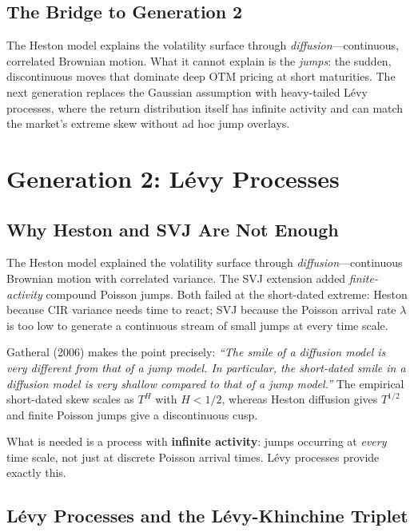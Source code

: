 \documentclass[12pt, a4paper]{article}
\begin{document}
\subsection{The Bridge to Generation 2}
\label{subsec:gen1-bridge}

The Heston model explains the volatility surface through \emph{diffusion}---continuous, correlated Brownian motion. What it cannot explain is the \emph{jumps}: the sudden, discontinuous moves that dominate deep OTM pricing at short maturities. The next generation replaces the Gaussian assumption with heavy-tailed L\'evy processes, where the return distribution itself has infinite activity and can match the market's extreme skew without ad hoc jump overlays.

\section{Generation 2: L\'evy Processes}
\label{sec:gen2-levy}

\subsection{Why Heston and SVJ Are Not Enough}
\label{subsec:gen2-motivation}

The Heston model explained the volatility surface through \emph{diffusion}---continuous Brownian motion with correlated variance. The SVJ extension added \emph{finite-activity} compound Poisson jumps. Both failed at the short-dated extreme: Heston because CIR variance needs time to react; SVJ because the Poisson arrival rate $\lambda$ is too low to generate a continuous stream of small jumps at every time scale.

Gatheral (2006) makes the point precisely: \emph{``The smile of a diffusion model is very different from that of a jump model. In particular, the short-dated smile in a diffusion model is very shallow compared to that of a jump model.''} The empirical short-dated skew scales as $T^H$ with $H < 1/2$, whereas Heston diffusion gives $T^{1/2}$ and finite Poisson jumps give a discontinuous cusp.

What is needed is a process with \textbf{infinite activity}: jumps occurring at \emph{every} time scale, not just at discrete Poisson arrival times. L\'evy processes provide exactly this.

\subsection{L\'evy Processes and the L\'evy-Khinchine Triplet}
\label{subsec:levy-theory}
\end{document}
